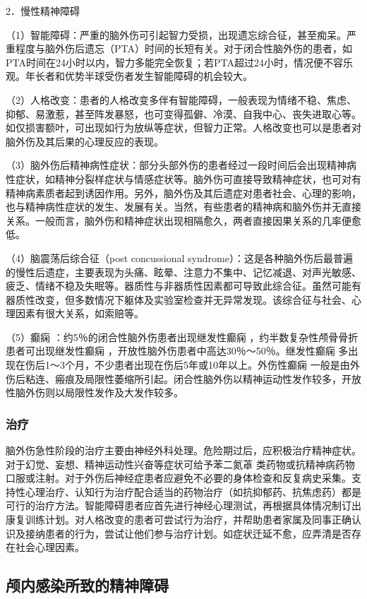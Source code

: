 2．慢性精神障碍

（1）智能障碍：严重的脑外伤可引起智力受损，出现遗忘综合征，甚至痴呆。严重程度与脑外伤后遗忘（PTA）时间的长短有关。对于闭合性脑外伤的患者，如PTA时间在24小时以内，智力多能完全恢复；若PTA超过24小时，情况便不容乐观。年长者和优势半球受伤者发生智能障碍的机会较大。

（2）人格改变：患者的人格改变多伴有智能障碍，一般表现为情绪不稳、焦虑、抑郁、易激惹，甚至阵发暴怒，也可变得孤僻、冷漠、自我中心、丧失进取心等。如仅损害额叶，可出现如行为放纵等症状，但智力正常。人格改变也可以是患者对脑外伤及其后果的心理反应的表现。

（3）脑外伤后精神病性症状：部分头部外伤的患者经过一段时间后会出现精神病性症状，如精神分裂样症状与情感症状等。脑外伤可直接导致精神症状，也可对有精神病素质者起到诱因作用。另外，脑外伤及其后遗症对患者社会、心理的影响，也与精神病性症状的发生、发展有关。当然，有些患者的精神病和脑外伤并无直接关系。一般而言，脑外伤和精神症状出现相隔愈久，两者直接因果关系的几率便愈低。

（4）脑震荡后综合征（post concussional
syndrome）：这是各种脑外伤后最普遍的慢性后遗症，主要表现为头痛、眩晕、注意力不集中、记忆减退、对声光敏感、疲乏、情绪不稳及失眠等。器质性与非器质性因素都可导致此综合征。虽然可能有器质性改变，但多数情况下躯体及实验室检查并无异常发现。该综合征与社会、心理因素有很大关系，如索赔等。

（5）癫痫
：约5％的闭合性脑外伤患者出现继发性癫痫
，约半数复杂性颅骨骨折患者可出现继发性癫痫
，开放性脑外伤患者中高达30％～50％。继发性癫痫
多出现在伤后1～3个月，不少患者出现在伤后5年或10年以上。外伤性癫痫
一般是由外伤后粘连、瘢痕及局限性萎缩所引起。闭合性脑外伤以精神运动性发作较多，开放性脑外伤则以局限性发作及大发作较多。

\subsubsection{治疗}

脑外伤急性阶段的治疗主要由神经外科处理。危险期过后，应积极治疗精神症状。对于幻觉、妄想、精神运动性兴奋等症状可给予苯二氮䓬
类药物或抗精神病药物口服或注射。对于外伤后神经症患者应避免不必要的身体检查和反复病史采集。支持性心理治疗、认知行为治疗配合适当的药物治疗（如抗抑郁药、抗焦虑药）都是可行的治疗方法。智能障碍患者应首先进行神经心理测试，再根据具体情况制订出康复训练计划。对人格改变的患者可尝试行为治疗，并帮助患者家属及同事正确认识及接纳患者的行为，尝试让他们参与治疗计划。如症状迁延不愈，应弄清是否存在社会心理因素。

\subsection{颅内感染所致的精神障碍}

